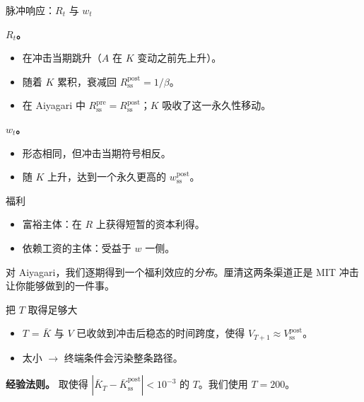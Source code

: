 \documentclass[10pt,aspectratio=169]{beamer}
\begin{document}
\begin{frame}{脉冲响应：$R_t$ 与 $w_t$}

\textbf{$R_t$。}

\begin{itemize}
  \item 在冲击当期跳升（$A$ 在 $K$ 变动之前先上升）。
  \item 随着 $K$ 累积，衰减回 $R^{\mathrm{post}}_{\mathrm{ss}} = 1/\beta$。
  \item 在 Aiyagari 中 $R^{\mathrm{pre}}_{\mathrm{ss}} = R^{\mathrm{post}}_{\mathrm{ss}}$；$K$ 吸收了这一永久性移动。
\end{itemize}

\textbf{$w_t$。}

\begin{itemize}
  \item 形态相同，但冲击当期符号相反。
  \item 随 $K$ 上升，达到一个永久更高的 $w^{\mathrm{post}}_{\mathrm{ss}}$。
\end{itemize}

\end{frame}

\begin{frame}{福利}

\begin{itemize}
  \item 富裕主体：在 $R$ 上获得短暂的资本利得。
  \item 依赖工资的主体：受益于 $w$ 一侧。
\end{itemize}

\vspace{0.6em}

对 Aiyagari，我们逐期得到一个福利效应的\emph{分布}。厘清这两条渠道正是 MIT 冲击让你能够做到的一件事。

\end{frame}

\begin{frame}{把 $T$ 取得足够大}

\begin{itemize}
  \item $T$ = $\bar K$ 与 $V$ 已收敛到冲击后稳态的时间跨度，使得 $V_{T+1} \approx V^{\mathrm{post}}_{\mathrm{ss}}$。
  \item 太小 $\to$ 终端条件会污染整条路径。
\end{itemize}

\vspace{0.4em}

\textbf{经验法则。} 取使得 $|\bar K_T - \bar K^{\mathrm{post}}_{\mathrm{ss}}| < 10^{-3}$ 的 $T$。我们使用 $T = 200$。

\end{frame}
\end{document}

